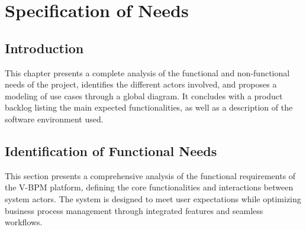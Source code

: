 \chapter{Specification of Needs}

\section{Introduction}

This chapter presents a complete analysis of the functional and non-functional needs of the project, identifies the different actors involved, and proposes a modeling of use cases through a global diagram. It concludes with a product backlog listing the main expected functionalities, as well as a description of the software environment used.

\section{Identification of Functional Needs}

This section presents a comprehensive analysis of the functional requirements of the V-BPM platform, defining the core functionalities and interactions between system actors. The system is designed to meet user expectations while optimizing business process management through integrated features and seamless workflows.


